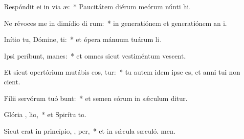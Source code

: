 \item Respóndit ei in via  æ:~* Paucitátem diérum meórum núnti hi.
\item Ne révoces me in dimídio di rum:~* in generatiónem et generatiónem an i.
\item Inítio tu, Dómine,  ti:~* et ópera mánuum tuárum  li.
\item Ipsi períbunt,   manes:~* et omnes sicut vestiméntum vescent.
\item Et sicut opertórium mutábis eos,  tur:~* tu autem idem ipse es, et anni tui non cient.
\item Fílii servórum tuó bunt:~* et semen eórum in sǽculum ditur.
\item Glória ,  lio,~* et Spirítu to.
\item Sicut erat in princípio,  ,  per,~* et in sǽcula sæculó. men.
